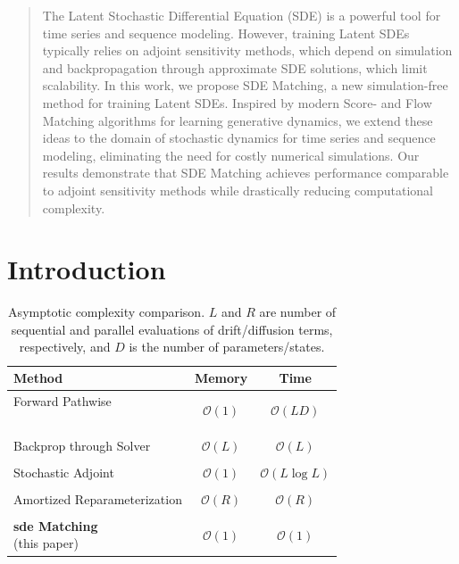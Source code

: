 \documentclass{article}
\def\O{\mathcal{O}}
\theoremstyle{plain}
\theoremstyle{definition}
\theoremstyle{remark}
\begin{document}
\begin{abstract}
The Latent Stochastic Differential Equation (SDE) is a powerful tool for time series and sequence modeling. However, training Latent SDEs typically relies on adjoint sensitivity methods, which depend on simulation and backpropagation through approximate SDE solutions, which limit scalability. In this work, we propose SDE Matching, a new simulation-free method for training Latent SDEs. Inspired by modern Score- and Flow Matching algorithms for learning generative dynamics, we extend these ideas to the domain of stochastic dynamics for time series and sequence modeling, eliminating the need for costly numerical simulations. Our results demonstrate that SDE Matching achieves performance comparable to adjoint sensitivity methods while drastically reducing computational complexity.
\end{abstract}


\glsresetall


\section{Introduction}
\label{sec:introduction}


\glsunsetall
\begin{table}[th]
\caption{Asymptotic complexity comparison. $L$ and $R$ are number of sequential and parallel evaluations of drift/diffusion terms, respectively, and $D$ is the number of parameters/states.}
\label{tab:complexity}
\centering
\setlength\extrarowheight{-7pt}
\begin{tabular}{lcc}
\toprule
    \textbf{Method} & \textbf{Memory} & \textbf{Time} \\ \midrule
    \makecell[l]{
        Forward Pathwise \\
        \citep{yang1991monte} \\
        \citep{gobet2005sensitivity}
    } & $\O(1)$ & $\O(LD)$ \\ \\
    \makecell[l]{
        Backprop through Solver \\
        \citep{giles2006smoking}
    } & $\O(L)$ & $\O(L)$ \\ \\
    \makecell[l]{
        Stochastic Adjoint \\
        \citep{li2020scalable}
    } & $\O(1)$ & $\O(L\log L)$ \\ \\
    \makecell[l]{
        Amortized Reparameterization \\
        \citep{course2024amortized}
    } & $\O(R)$ & $\O(R)$ \\ \\
    \makecell[l]{
        \textbf{\gls{sde} Matching} \\
        (this paper)
    } & $\O(1)$ & $\O(1)$
    \\
\bottomrule
\end{tabular}
\end{table}
\glsresetall
\end{document}
